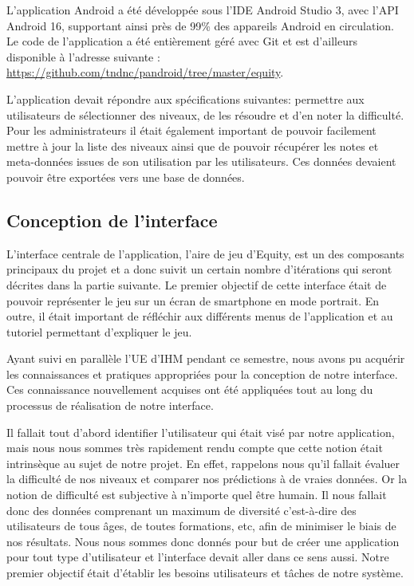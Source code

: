 \documentclass[../main.tex]{subfiles}
\begin{document}
	L'application Android a été développée sous l'IDE Android Studio 3, avec l'API Android 16, supportant ainsi près de 99\% des appareils Android en circulation. Le code de l'application a été entièrement géré avec Git et est d'ailleurs disponible à l'adresse suivante : \url{https://github.com/tndnc/pandroid/tree/master/equity}. 
	
	L'application devait répondre aux spécifications suivantes: permettre aux utilisateurs de sélectionner des niveaux, de les résoudre et d'en noter la difficulté. Pour les administrateurs il était également important de pouvoir facilement mettre à jour la liste des niveaux ainsi que de pouvoir récupérer les notes et meta-données issues de son utilisation par les utilisateurs. Ces données devaient pouvoir être exportées vers une base de données.
	
	\subsection{Conception de l'interface}
	
L'interface centrale de l'application, l'aire de jeu d'Equity, est un des composants principaux du projet et a donc suivit un certain nombre d'itérations qui seront décrites dans la partie suivante. Le premier objectif de cette interface était de pouvoir représenter le jeu sur un écran de smartphone en mode portrait. En outre, il était important de réfléchir aux différents menus de l'application et au tutoriel permettant d'expliquer le jeu.

Ayant suivi en parallèle l'UE d'IHM pendant ce semestre, nous avons pu acquérir les connaissances et pratiques appropriées pour la conception de notre interface. Ces connaissance nouvellement acquises ont été appliquées tout au long du processus de réalisation de notre interface.

Il fallait tout d'abord identifier l'utilisateur qui était visé par notre application, mais nous nous sommes très rapidement rendu compte que cette notion était intrinsèque au sujet de notre projet. En effet, rappelons nous qu'il fallait évaluer la difficulté de nos niveaux et comparer nos prédictions à de vraies données. Or la notion de difficulté est subjective à n'importe quel être humain. Il nous fallait donc des données comprenant un maximum de diversité c'est-à-dire des utilisateurs de tous âges, de toutes formations, etc, afin de minimiser le biais de nos résultats. Nous nous sommes donc donnés pour but de créer une application pour tout type d'utilisateur et l'interface devait aller dans ce sens aussi. Notre premier objectif était d'établir les besoins utilisateurs et tâches de notre système.
\end{document}
